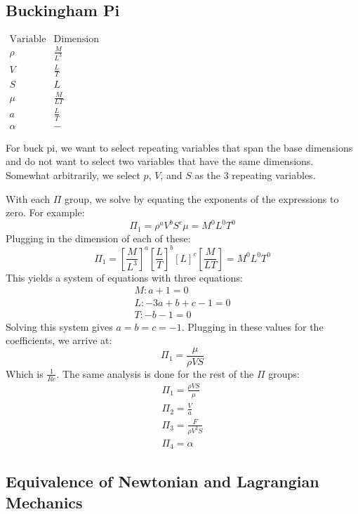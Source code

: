 \documentclass[12pt]{report}
\begin{document}
\subsection{Buckingham Pi}\label{Buckingham Pi Deriv}

\begin{center}
$\begin{array}{ccc}
     \text{Variable} & \text{Dimension}
     &  \\ \rho & \frac{M}{L^3}
     &  \\ V    & \frac{L}{T}
     &  \\ S    & L
     &  \\\mu &  \frac{M}{LT}
     &  \\a & \frac{L}{T}
     & \\\alpha & -
\end{array}$
\end{center}

For \gls{buck pi}, we want to select repeating variables that span the base dimensions and do not want to select two variables that have the same dimensions. Somewhat arbitrarily, we select $p$, $V$, and $S$ as the 3 repeating variables.

With each $\Pi$ group, we solve by equating the exponents of the expressions to zero. For example:
$$\Pi_1=\rho^aV^bS^c\mu=M^0L^0T^0$$
Plugging in the dimension of each of these:
$$\Pi_1=\left[\frac{M}{L^3}\right]^a\left[\frac{L}{T}\right]^b[L]^c\left[\frac{M}{LT}\right]=M^0L^0T^0$$
This yields a system of equations with three equations:
\begin{gather}
    M:a+1=0\\L:-3a+b+c-1=0\\T:-b-1=0
\end{gather}
Solving this system gives $a=b=c=-1$. Plugging in these values for the coefficients, we arrive at:
$$\Pi_1=\frac{\mu}{\rho VS}$$
Which is $\frac{1}{Re}$.  The same analysis is done for the rest of the $\Pi$ groups:
\begin{gather}
    \Pi_1=\frac{\rho VS}{\mu}\\
    \Pi_2=\frac{V}{a}\\
    \Pi_3=\frac{F}{\rho V^2S}\\
    \Pi_4=\alpha
\end{gather}
\subsection{Equivalence of Newtonian and Lagrangian Mechanics}\label{equiv newt and lang}
\end{document}
